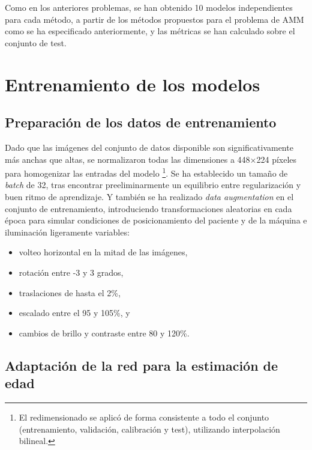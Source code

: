 Como en los anteriores problemas, se han obtenido 10 modelos independientes para cada método, a partir de los métodos propuestos para el problema de AMM como se ha especificado anteriormente, y las métricas se han calculado sobre el conjunto de test.


\section{Entrenamiento de los modelos}

\subsection{Preparación de los datos de entrenamiento}

Dado que las imágenes del conjunto de datos disponible son significativamente más anchas que altas, se normalizaron todas las dimensiones a 448×224 píxeles para homogenizar las entradas del modelo%
\footnote{
    El redimensionado se aplicó de forma consistente a todo el conjunto (entrenamiento, validación, calibración y test), utilizando interpolación bilineal.
}.
Se ha establecido un tamaño de \textit{batch} de 32, tras encontrar preeliminarmente un equilibrio entre regularización y buen ritmo de aprendizaje. Y también se ha realizado \textit{data augmentation} en el conjunto de entrenamiento, introduciendo transformaciones aleatorias en cada época para simular condiciones de posicionamiento del paciente y de la máquina e iluminación ligeramente variables: 
\begin{itemize}
    \item volteo horizontal en la mitad de las imágenes,
    \item rotación entre -3 y 3 grados,
    \item traslaciones de hasta el 2\%,
    \item escalado entre el 95 y 105\%, y
    \item cambios de brillo y contraste entre 80 y 120\%. 
\end{itemize}


\subsection{Adaptación de la red para la estimación de edad}

